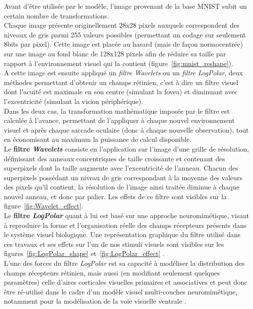 Avant d'être utilisée par le modèle, l'image provenant de la base MNIST subit un certain nombre de transformations.\\
Chaque image présente originellement 28x28 pixels auxquels correspondent des niveaux de gris parmi 255 valeurs possibles (permettant un codage sur seulement 8bits par pixel). Cette image est placée au hasard (mais de façon normocentrée) sur une image au fond blanc de 128x128 pixels afin de réduire sa taille par rapport à l'environnement visuel qui la contient (figure~\ref{fig:mnist_reshape}).\\
A cette image est ensuite appliqué un \textit{filtre Wavelets} ou un \textit{filtre LogPolar}, deux méthodes permettant d'obtenir un champs rétinien, c'est à dire un filtre visuel dont l'acuité est maximale en son centre (simulant la fovea) et diminuant avec l'excentricité (simulant la vision périphérique). \\
Dans les deux cas, la transformation mathématique imposée par le filtre est calculée à l'avance, permettant de l'appliquer à chaque nouvel environnement visuel et après chaque saccade oculaire (donc à chaque nouvelle observation), tout en économisant au maximum la puissance de calcul disponible.\autocite{Kortum1996}\\
Le \textbf{filtre \textit{Wavelets}} consiste en l'application sur l'image d'une grille de résolution, définissant des anneaux concentriques de taille croissante et contenant des superpixels dont la taille augmente avec l'excentricité de l'anneau. Chacun des superpixels possédant un niveau de gris correspondant à la moyenne des valeurs des pixels qu'il contient, la résolution de l'image ainsi traitée diminue à chaque nouvel anneau, et donc par palier.\autocite{Kortum1996}
Les effets de ce filtre sont visibles sur la figure~\ref{fig:Wavelet_effect}.\\
Le \textbf{filtre \textit{LogPolar}} quant à lui est basé sur une approche neuromimétique, visant à reproduire la forme et l'organisation réelle des champs récepteurs présents dans le système visuel biologique. Une représentation graphique du filtre utilisé dans ces travaux et ses effets sur l'un de nos stimuli visuels sont visibles sur les figures~\ref{fig:LogPolar_shape} et~\ref{fig:LogPolar_effect} .\\
L'une des forces du filtre \textit{LogPolar} est sa capacité à modéliser la distribution des champs récepteurs rétinien, mais aussi (en modifiant seulement quelques paramètres) celle d'aires corticales visuelles primaires et associatives et peut donc être ré-utilisé dans le cadre d'un modèle visuel multi-couches neuromimétique, notamment pour la modélisation de la voie visuelle ventrale \autocite{Freeman2011}.

